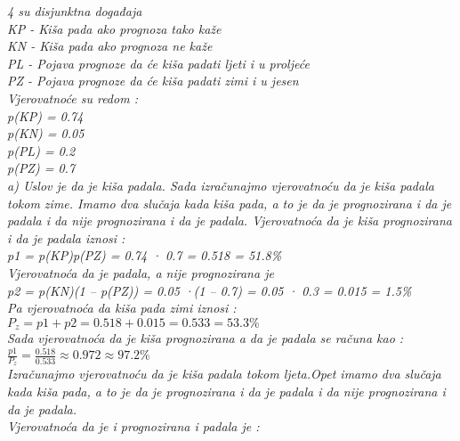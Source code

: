 \documentclass[12pt]{article}
\begin{document}
\begin{enumerate}
		\begin{center}
		\textit{
		4 su disjunktna događaja\\
KP - Kiša pada ako prognoza tako kaže\\
KN - Kiša pada ako prognoza ne kaže\\
PL - Pojava prognoze da će kiša padati ljeti i u proljeće\\
PZ - Pojava prognoze da će kiša padati zimi i u jesen\\
\vspace{0.25cm}
Vjerovatnoće su redom : \\ \vspace{0.15cm}
p(KP) = 0.74\\
p(KN) = 0.05\\
p(PL) = 0.2\\
p(PZ) = 0.7\\
\vspace{0.25cm}
a) Uslov je da je kiša padala. Sada izračunajmo vjerovatnoću da je kiša
padala tokom zime. Imamo dva slučaja kada kiša pada, a to je da je prognozirana i da je padala i da nije prognozirana i da je padala. Vjerovatnoća da
je kiša prognozirana i da je padala iznosi : \\ \vspace{0.15cm}
p1 = p(KP)p(PZ) = 0.74 · 0.7 = 0.518 = 51.8\%
\\ \vspace{0.25cm}
Vjerovatnoća da je padala, a nije prognozirana je\\ \vspace{0.15cm}
p2 = p(KN)(1 – p(PZ)) = 0.05 ·(1 – 0.7) = 0.05 · 0.3 = 0.015 = 1.5\%
\\ \vspace{0.25cm} Pa vjerovatnoća da kiša pada zimi iznosi : 
\\ \vspace{0.15cm}
$P_z = p1 + p2 = 0.518 + 0.015 = 0.533 = 53.3\%$
\\ \vspace{0.15cm} Sada vjerovatnoća da je kiša prognozirana a da je padala se računa kao : \\
$\frac{p1}{P_z} = \frac{0.518}{0.533} \approx 0.972 \approx 97.2\%$
\\ \vspace{0.25cm}
Izračunajmo vjerovatnoću da je kiša padala tokom ljeta.Opet imamo
dva slučaja kada kiša pada, a to je da je prognozirana i da je padala i da nije
prognozirana i da je padala.\\ \vspace{0.15cm} Vjerovatnoća da je i prognozirana i padala je : \\ \vspace{0.15cm}
}
\end{center}
\end{enumerate}
\end{document}
